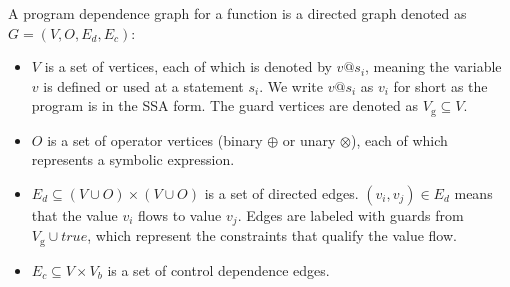 

\begin{definition}[]
\label{def:pdg}
A program dependence graph for a function is a directed graph denoted as $G=(V, O, E_d, E_c)$:
\begin{itemize}
    \item $V$ is a set of vertices, each of which is denoted by $v@s_i$, meaning the variable $v$ is defined or used at a statement $s_i$.
    We write $v@s_i$ as $v_i$ for short as the program is in the SSA form.
    The guard vertices are denoted as $V_{\text{g}} \subseteq V$.
    \item $O$ is a set of operator vertices (binary $\oplus$ or unary $\otimes$), each of which represents a symbolic expression.
    \item $E_d \subseteq (V \cup O) \times (V \cup O)$ is a set of directed edges.
    $(v_i, v_j) \in E_d$ means that the value $v_i$ flows to value $v_j$.
    Edges are labeled with guards from $V_{\text{g}} \cup true $, which represent the constraints that qualify the value flow.
    \item $E_c \subseteq V \times V_b$ is a set of control dependence edges.
\end{itemize}

\end{definition}

